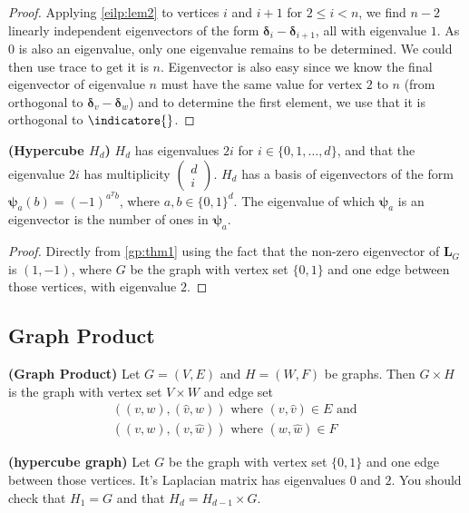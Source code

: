 \documentclass{article}
\newcommand{\bsl}[1]{\boldsymbol{#1}}
\newcommand{\bfs}[1]{\textbf{({#1}) }}
\begin{document}
\begin{proof}
Applying \cref{eilp:lem2} to vertices $i$ and $i+1$ for $2 \leq i<n$, we find $n-2$ linearly independent eigenvectors of the form $\boldsymbol{\delta}_{i}-\boldsymbol{\delta}_{i+1}$, all with eigenvalue $1 .$ As 0 is also an eigenvalue, only one eigenvalue remains to be determined. We could then use trace to get it is $n$. Eigenvector is also easy since we know the final eigenvector of eigenvalue $n$ must have the same value for vertex $2$ to $n$ (from orthogonal to $\boldsymbol{\delta}_{v}-\boldsymbol{\delta}_{w}$) and to determine the first element, we use that it is orthogonal to $\indicatore{}$.
\end{proof} 
\begin{lema}{\bfs{Hypercube $H_d$}}
 $H_{d}$ has eigenvalues $2 i$ for $i \in\{0,1, \ldots, d\}$, and that the eigenvalue $2 i$ has multiplicity $\left(\begin{array}{l}d \\ i\end{array}\right) .$  $H_{d}$ has a basis of eigenvectors of the form $\bsl{\psi}_{a}(b)=(-1)^{a^{T} b}$,
where $a,b \in\{0,1\}^{d}$. The eigenvalue of which $\boldsymbol{\psi}_{a}$ is an eigenvector is the number of ones in $\boldsymbol{\psi}_{a}$.
\end{lema}
\begin{proof}
Directly from \cref{gp:thm1} using the fact that the non-zero eigenvector of $\boldsymbol{L}_{G}$ is $(1,-1)$, where $G$ be the graph with vertex set $\{0,1\}$ and one edge between those vertices, with eigenvalue $2$.
\end{proof}

\subsection{Graph Product}

\begin{defa}{\bfs{Graph Product}}
Let $G=(V, E)$ and $H=(W, F)$ be graphs. Then $G \times H$ is the graph with vertex set $V \times W$ and edge set
$$
\begin{array}{l}
((v, w),(\hat{v}, w)) \text { where }(v, \hat{v}) \in E \text { and } \\
((v, w),(v, \hat{w})) \text { where }(w, \hat{w}) \in F
\end{array}
$$
\end{defa} 
\begin{rema}{\bfs{hypercube graph}}
Let $G$ be the graph with vertex set $\{0,1\}$ and one edge between those vertices. It's Laplacian matrix has eigenvalues 0 and $2 .$ You should check that $H_{1}=G$ and that $H_{d}=H_{d-1} \times G$.
\end{rema}
\end{document}
